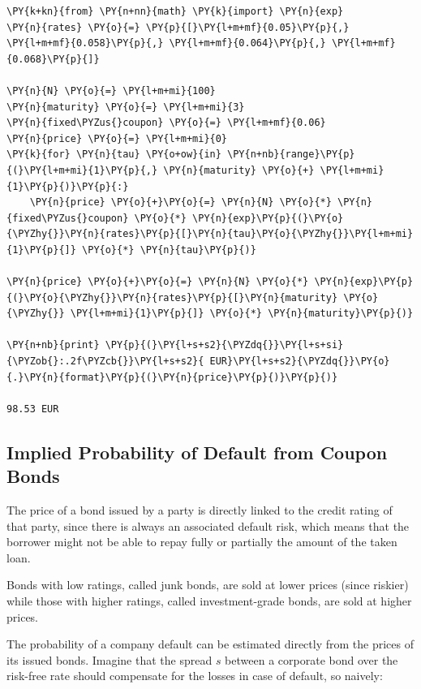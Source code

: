 \begin{tcolorbox}[breakable, size=fbox, boxrule=1pt, pad at break*=1mm,colback=cellbackground, colframe=cellborder]
\begin{Verbatim}[commandchars=\\\{\}]
\PY{k+kn}{from} \PY{n+nn}{math} \PY{k}{import} \PY{n}{exp}
\PY{n}{rates} \PY{o}{=} \PY{p}{[}\PY{l+m+mf}{0.05}\PY{p}{,} \PY{l+m+mf}{0.058}\PY{p}{,} \PY{l+m+mf}{0.064}\PY{p}{,} \PY{l+m+mf}{0.068}\PY{p}{]}

\PY{n}{N} \PY{o}{=} \PY{l+m+mi}{100}
\PY{n}{maturity} \PY{o}{=} \PY{l+m+mi}{3}
\PY{n}{fixed\PYZus{}coupon} \PY{o}{=} \PY{l+m+mf}{0.06}
\PY{n}{price} \PY{o}{=} \PY{l+m+mi}{0}
\PY{k}{for} \PY{n}{tau} \PY{o+ow}{in} \PY{n+nb}{range}\PY{p}{(}\PY{l+m+mi}{1}\PY{p}{,} \PY{n}{maturity} \PY{o}{+} \PY{l+m+mi}{1}\PY{p}{)}\PY{p}{:}
    \PY{n}{price} \PY{o}{+}\PY{o}{=} \PY{n}{N} \PY{o}{*} \PY{n}{fixed\PYZus{}coupon} \PY{o}{*} \PY{n}{exp}\PY{p}{(}\PY{o}{\PYZhy{}}\PY{n}{rates}\PY{p}{[}\PY{n}{tau}\PY{o}{\PYZhy{}}\PY{l+m+mi}{1}\PY{p}{]} \PY{o}{*} \PY{n}{tau}\PY{p}{)}

\PY{n}{price} \PY{o}{+}\PY{o}{=} \PY{n}{N} \PY{o}{*} \PY{n}{exp}\PY{p}{(}\PY{o}{\PYZhy{}}\PY{n}{rates}\PY{p}{[}\PY{n}{maturity} \PY{o}{\PYZhy{}} \PY{l+m+mi}{1}\PY{p}{]} \PY{o}{*} \PY{n}{maturity}\PY{p}{)}
    
\PY{n+nb}{print} \PY{p}{(}\PY{l+s+s2}{\PYZdq{}}\PY{l+s+si}{\PYZob{}:.2f\PYZcb{}}\PY{l+s+s2}{ EUR}\PY{l+s+s2}{\PYZdq{}}\PY{o}{.}\PY{n}{format}\PY{p}{(}\PY{n}{price}\PY{p}{)}\PY{p}{)}

98.53 EUR
\end{Verbatim}
\end{tcolorbox}

\subsection{Implied Probability of Default from Coupon Bonds}\label{default-probabilities-and-bond-prices}

The price of a bond issued by a party is directly linked to the credit
rating of that party, since there is always an associated default risk, which means that the borrower might not be able to repay
fully or partially the amount of the taken loan. 

Bonds with low ratings, called junk bonds, are sold at lower prices (since riskier) while those with higher ratings, called investment-grade bonds, are sold at higher prices.

The probability of a company default can be estimated directly from
the prices of its issued bonds. Imagine that the spread $s$
between a corporate bond over the risk-free rate should compensate for
the losses in case of default, so naively:

